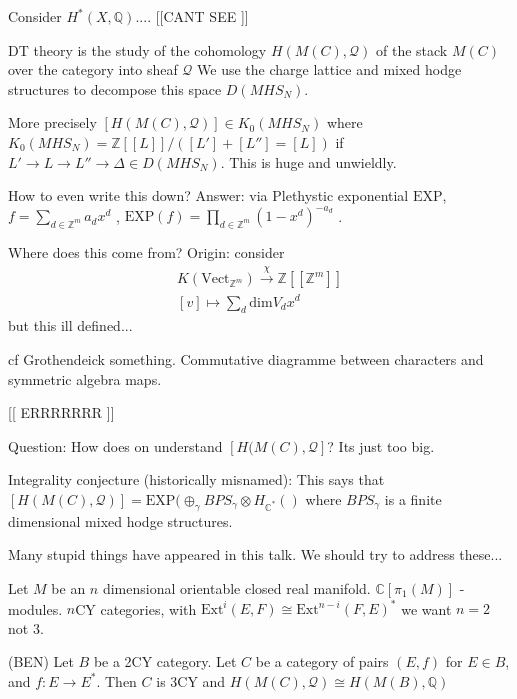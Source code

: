 Consider $ H^* ( X, \mathbb{Q} ) .... $ 
[[CANT SEE ]] 

DT theory is the study of the cohomology $ H( M ( C) , \mathcal{Q}  ) $ of the stack $M( C) $ over the category into sheaf $ \mathcal{Q} $  
We use the charge lattice and mixed hodge structures to decompose this space $D(MHS_N) $.

More precisely $[H(M(C), \mathcal{Q} ) ] \in K_0 (MHS_N) $ where 
$ K_0 ( MHS_N) = \mathbb{Z} [[L]] / ([L'] +[L''] = [L] ) $ if $ L' \rightarrow L \rightarrow L'' \rightarrow \Delta \in D(MHS_N) $. 
This is huge and unwieldly. 

How to even write this down? 
Answer: via Plethystic exponential $\mathrm{EXP} $, 
$f = \sum_{d \in \mathbb{Z} ^m } a_d x^d $ , 
$ \mathrm{EXP} (f) = \prod_{d \in \mathbb{Z} ^m } ( 1 - x^d ) ^{-a_d } $ . 

Where does this come from?
Origin: consider 
\begin{align}
    K ( \mathrm{Vect} _{\mathbb{Z} ^m } ) \xrightarrow{\chi} \mathbb{Z} [[\mathbb{Z} ^m ]] \\
    [v] \mapsto \sum _d \mathrm{dim} V_d x^d 
\end{align}
but this ill defined... 

cf Grothendeick something. 
Commutative diagramme between characters and symmetric algebra maps. 

[[ ERRRRRRR ]]

Question: How does on understand $[ H(M(C), \mathcal{Q} ] $?
Its just too big. 

Integrality conjecture (historically misnamed):
This says that $ [H ( M (C), \mathcal{Q} ) ]  = \mathrm{EXP} ( \oplus_{\gamma} BPS_\gamma \otimes H_{\mathbb{C} ^* }  () $ 
where $ BPS _\gamma $ is a finite dimensional mixed hodge structures. 

Many stupid things have appeared in this talk. 
We should try to address these...

Let $ M $ be an $n$ dimensional orientable closed real manifold. 
$ \mathbb{C} [\pi_1 ( M) ]$ -modules. 
$n$CY categories, with $ \mathrm{Ext}^i (E,F) \cong \mathrm{Ext}^{n-i} ( F, E ) ^* $
we want $ n = 2 $ not $3$. 

\begin{theorem}
    (BEN) 
    Let $B$ be a 2CY category. 
    Let $ C $ be a category of pairs $(E,f)$ for $ E \in B $, and $ f: E \rightarrow E^* $.
    Then $C$ is 3CY  and $H ( M(C) , \mathcal{Q} ) \cong H( M( B) , \mathbb{Q} ) $ 
\end{theorem}

